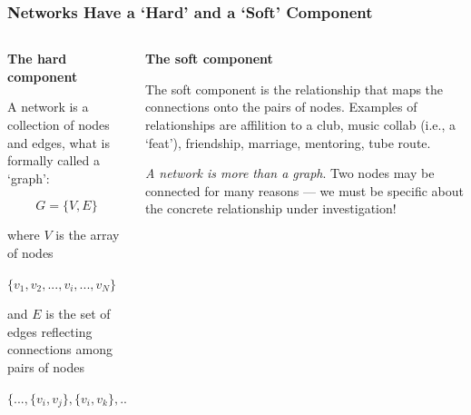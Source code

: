\documentclass[notes, aspectratio=1610]{beamer}
\begin{document}
\begin{frame}[t]
	\frametitle{Networks Have a `Hard' and a `Soft' Component}
	\begin{small}
	\begin{columns}[t]
		\begin{column}{0.45\textwidth}
			\begin{center}
				\textbf{The hard component}
			\end{center}

			A network is a collection of nodes and edges, what is
			formally called a `graph':

			\vspace{-0.75em}

			\begin{equation}
				G = \{V, E\}
			\end{equation}

			where $V$ is the array of nodes 

			\vspace{1em}

			$\{v_{1}, v_{2}, ... , v_{i}, ... , v_{N}\}$
			
			\vspace{1em}
			
			and $E$ is the set of edges reflecting connections among
			pairs of nodes

			\vspace{1em}
			
			$\{..., \{v_{i}, v_{j}\}, \{v_{i}, v_{k}\}, ...\}$
		\end{column}
		\begin{column}{0.45\textwidth}
			\begin{center}
				\textbf{The soft component}
			\end{center}

			The soft component is the relationship that maps 
			the connections onto the pairs of nodes.
			Examples of relationships are affilition to a club,
		        music collab (i.e., a `feat'), friendship, marriage, 
			mentoring, tube route.

			\begin{tcolorbox}[
				colback=comp_c!5!white,
				colframe=comp_c!90!black,
				title={\centering !! Pay attention !!}]
				\emph{A network is more than a graph}. 
				Two nodes may be connected for many reasons --- 
				we must be specific about the concrete 
				relationship under investigation!
			\end{tcolorbox}
		\end{column}
	\end{columns}
\end{small}
\end{frame}
\end{document}
